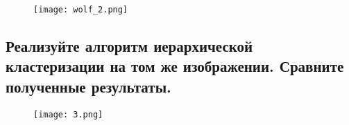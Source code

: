 \begin{figure}[h]
\centering
    \texttt{[image: wolf\_2.png]}
  \label{sec:purpose:payings}
\end{figure}

\subsection{Реализуйте алгоритм иерархической кластеризации на том же изображении. Сравните полученные результаты.}

\begin{figure}[h]
\centering
    \texttt{[image: 3.png]}
  \label{sec:purpose:payings}
\end{figure}


